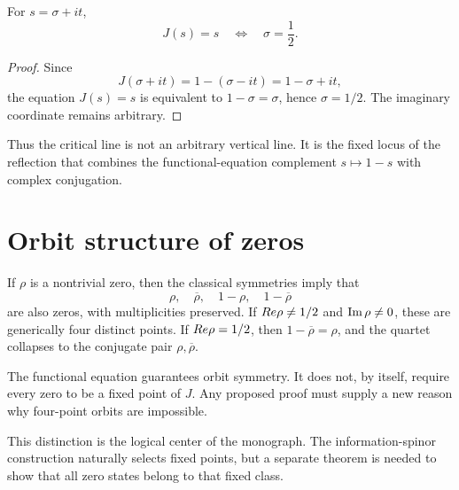 \begin{theorem}
For $s=\sigma+it$,
\begin{equation}
J(s)=s
\quad\Longleftrightarrow\quad
\sigma=\frac12.
\end{equation}
\end{theorem}

\begin{proof}
Since
\begin{equation}
J(\sigma+it)=1-(\sigma-it)=1-\sigma+it,
\end{equation}
the equation $J(s)=s$ is equivalent to $1-\sigma=\sigma$, hence $\sigma=1/2$. The imaginary coordinate remains arbitrary.
\end{proof}

Thus the critical line is not an arbitrary vertical line. It is the fixed locus of the reflection that combines the functional-equation complement $s\mapsto1-s$ with complex conjugation.

\section{Orbit structure of zeros}
If $\rho$ is a nontrivial zero, then the classical symmetries imply that
\begin{equation}
\rho,\quad \overline{\rho},\quad 1-\rho,\quad 1-\overline{\rho}
\end{equation}
are also zeros, with multiplicities preserved. If $Re\rho\neq1/2$ and $\operatorname{Im}\rho\neq0$, these are generically four distinct points. If $Re\rho=1/2$, then $1-\overline{\rho}=\rho$, and the quartet collapses to the conjugate pair $\rho,\overline{\rho}$.

\begin{warning}
The functional equation guarantees orbit symmetry. It does not, by itself, require every zero to be a fixed point of $J$. Any proposed proof must supply a new reason why four-point orbits are impossible.
\end{warning}

This distinction is the logical center of the monograph. The information-spinor construction naturally selects fixed points, but a separate theorem is needed to show that all zero states belong to that fixed class.

